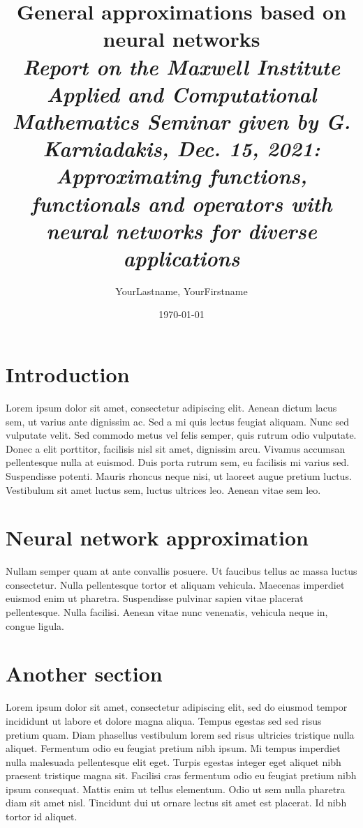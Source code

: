 \documentclass[11pt]{isr} %
\title{{\bf General approximations based on neural networks}\\
{\em Report on the Maxwell Institute Applied and Computational Mathematics Seminar given by G. Karniadakis, Dec. 15, 2021:  Approximating functions, functionals and operators with neural networks for diverse applications}} %
\author{YourLastname, YourFirstname} %
\date{\today} %
\begin{document}
\maketitle %




\section*{Introduction}
Lorem ipsum dolor sit amet, consectetur adipiscing elit.\cite{Smith:2012}  Aenean dictum lacus sem, ut varius ante dignissim ac. Sed a mi quis lectus feugiat aliquam. Nunc sed vulputate velit. Sed commodo metus vel felis semper, quis rutrum odio vulputate. Donec a elit porttitor, facilisis nisl sit amet, dignissim arcu. Vivamus accumsan pellentesque nulla at euismod. Duis porta rutrum sem, eu facilisis mi varius sed. Suspendisse potenti. Mauris rhoncus neque nisi, ut laoreet augue pretium luctus. Vestibulum sit amet luctus sem, luctus ultrices leo. Aenean vitae sem leo.

\section*{Neural network approximation}
Nullam semper quam at ante convallis posuere.\cite{Smith:2013} Ut faucibus tellus ac massa luctus consectetur. Nulla pellentesque tortor et aliquam vehicula. Maecenas imperdiet euismod enim ut pharetra. Suspendisse pulvinar sapien vitae placerat pellentesque. Nulla facilisi. Aenean vitae nunc venenatis, vehicula neque in, congue ligula.

\section*{Another section}
Lorem ipsum dolor sit amet, consectetur adipiscing elit, sed do eiusmod tempor incididunt ut labore et dolore magna aliqua. Tempus egestas sed sed risus pretium quam. Diam phasellus vestibulum lorem sed risus ultricies tristique nulla aliquet. Fermentum odio eu feugiat pretium nibh ipsum. Mi tempus imperdiet nulla malesuada pellentesque elit eget. Turpis egestas integer eget aliquet nibh praesent tristique magna sit. Facilisi cras fermentum odio eu feugiat pretium nibh ipsum consequat. Mattis enim ut tellus elementum. Odio ut sem nulla pharetra diam sit amet nisl. Tincidunt dui ut ornare lectus sit amet est placerat. Id nibh tortor id aliquet.
\end{document}
